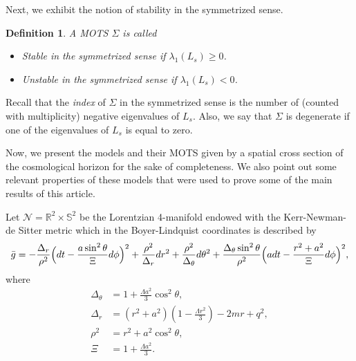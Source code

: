 \documentclass[a4paper, 11pt, reqno]{amsart}
\newtheorem{definition}[theo]{Definition}
\begin{document}
Next, we exhibit the notion of stability in the symmetrized sense.
\begin{definition}
A MOTS $\Sigma$ is called
\begin{itemize}
    \item Stable in the symmetrized sense if $\lambda_1(L_s)\geq0$.
    \item Unstable in the symmetrized sense if $\lambda_1(L_s)<0$.
\end{itemize}
    \end{definition}
\noindent  Recall that the {\it{index}} of $\Sigma$ in the symmetrized sense is the number of (counted with multiplicity) negative eigenvalues of $L_s$. Also, we say that $\Sigma$ is degenerate if one of the eigenvalues of $L_s$ is equal to zero.

Now, we present the models and their MOTS given by a spatial cross section of the cosmological horizon for the sake of completeness. We also point out some relevant properties of these models that were used to prove some of the main results of this article.

 Let $\mathcal{N}=\mathbb{R}^2\times\mathbb{S}^2$ be the Lorentzian 4-manifold endowed with the Kerr-Newman-de Sitter metric \cite{BK, CCK} which in the Boyer-Lindquist coordinates is described by
\begin{equation}\label{Kerr-Newman-de Sitter metric}
 \Bar{g}=-\frac{\Delta_r}{\rho^2}\Big(dt-\frac{a\sin^2\theta}{\Xi}d\phi\Big)^2+\frac{\rho^2}{\Delta_r}dr^2+\frac{\rho^2}{\Delta_{\theta}}d\theta^2+\frac{\Delta_{\theta}\sin^2\theta}{\rho^2}\Big(adt-\frac{r^2+a^2}{\Xi}d\phi\Big)^2,
\end{equation}
where
\begin{align*}
\Delta_{\theta}&=1+\frac{\Lambda a^2}{3}\cos^2\theta,\\
\Delta_ r&=(r^2+a^2)\left(1-\frac{\Lambda r^2}{3}\right)-2mr+q^2,\\
\rho^2&=r^2+a^2\cos^2\theta,\\
\Xi &= 1+\frac{\Lambda a^2}{3}.
\end{align*}
\end{document}
